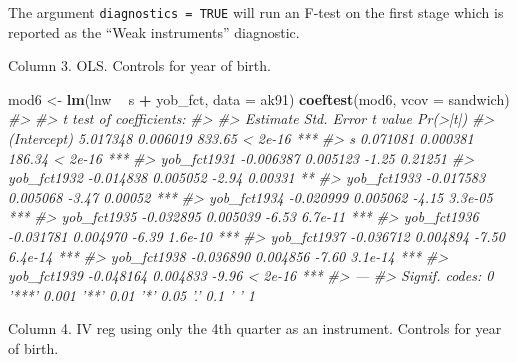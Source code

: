 \documentclass[]{book}
\newenvironment{Shaded}{\begin{snugshade}}{\end{snugshade}}
\newcommand{\KeywordTok}[1]{\textcolor[rgb]{0.13,0.29,0.53}{\textbf{#1}}}
\newcommand{\DataTypeTok}[1]{\textcolor[rgb]{0.13,0.29,0.53}{#1}}
\newcommand{\StringTok}[1]{\textcolor[rgb]{0.31,0.60,0.02}{#1}}
\newcommand{\CommentTok}[1]{\textcolor[rgb]{0.56,0.35,0.01}{\textit{#1}}}
\newcommand{\OperatorTok}[1]{\textcolor[rgb]{0.81,0.36,0.00}{\textbf{#1}}}
\newcommand{\NormalTok}[1]{#1}
\theoremstyle{definition}
\theoremstyle{definition}
\theoremstyle{definition}
\theoremstyle{remark}
\begin{document}
The argument \texttt{diagnostics\ =\ TRUE} will run an F-test on the
first stage which is reported as the ``Weak instruments'' diagnostic.

Column 3. OLS. Controls for year of birth.

\begin{Shaded}
\begin{Highlighting}[]
\NormalTok{mod6 <-}\StringTok{ }\KeywordTok{lm}\NormalTok{(lnw }\OperatorTok{~}\StringTok{ }\NormalTok{s }\OperatorTok{+}\StringTok{ }\NormalTok{yob_fct, }\DataTypeTok{data =}\NormalTok{ ak91)}
\KeywordTok{coeftest}\NormalTok{(mod6, }\DataTypeTok{vcov =}\NormalTok{ sandwich)}
\CommentTok{#> }
\CommentTok{#> t test of coefficients:}
\CommentTok{#> }
\CommentTok{#>              Estimate Std. Error t value Pr(>|t|)    }
\CommentTok{#> (Intercept)  5.017348   0.006019  833.65  < 2e-16 ***}
\CommentTok{#> s            0.071081   0.000381  186.34  < 2e-16 ***}
\CommentTok{#> yob_fct1931 -0.006387   0.005123   -1.25  0.21251    }
\CommentTok{#> yob_fct1932 -0.014838   0.005052   -2.94  0.00331 ** }
\CommentTok{#> yob_fct1933 -0.017583   0.005068   -3.47  0.00052 ***}
\CommentTok{#> yob_fct1934 -0.020999   0.005062   -4.15  3.3e-05 ***}
\CommentTok{#> yob_fct1935 -0.032895   0.005039   -6.53  6.7e-11 ***}
\CommentTok{#> yob_fct1936 -0.031781   0.004970   -6.39  1.6e-10 ***}
\CommentTok{#> yob_fct1937 -0.036712   0.004894   -7.50  6.4e-14 ***}
\CommentTok{#> yob_fct1938 -0.036890   0.004856   -7.60  3.1e-14 ***}
\CommentTok{#> yob_fct1939 -0.048164   0.004833   -9.96  < 2e-16 ***}
\CommentTok{#> ---}
\CommentTok{#> Signif. codes:  0 '***' 0.001 '**' 0.01 '*' 0.05 '.' 0.1 ' ' 1}
\end{Highlighting}
\end{Shaded}

Column 4. IV reg using only the 4th quarter as an instrument. Controls
for year of birth.
\end{document}
